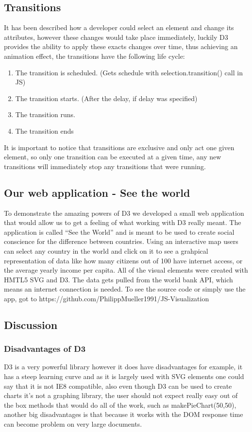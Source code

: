 \documentclass{bioinfo}
\begin{document}
\subsection{Transitions} \label{s:transitions}
It has been described how a developer could select an element and change its attributes, however these changes would take place immediately, luckily D3 provides the ability to apply these exacts changes over time, thus achieving an animation effect, the transitions have the following life cycle:
\begin{enumerate}
\item The transition is scheduled. (Gets schedule with selection.transition() call in JS)
\item The transition starts. (After the delay, if delay was specified)
\item The transition runs.
\item The transition ends
\end{enumerate}
It is important to notice that transitions are exclusive and only act one given element, so only one transition can be executed at a given time, any new transitions will immediately stop any transitions that were running.

\subsection{Our web application - See the world}
To demonstrate the amazing powers of D3 we developed a small web application that would allow us to get a feeling of what working with D3 really meant. The application is called “See the World” and is meant to be used to create social conscience for the difference between countries. Using an interactive map users can select any country in the world and click on it to see a grahpical representation of data like how many citizens out of 100 have internet access, or the average yearly income per capita.
\newline
All of the visual elements were created with HMTL5 SVG and D3. The data gets pulled from the world bank API, which means an internet connection is needed. To see the source code or simply use the app, got to https://github.com/PhilippMueller1991/JS-Visualization

\subsection{Discussion}
\subsubsection{Disadvantages of D3}
\hfill \break
D3 is a very powerful library however it does have disadvantages for example, it has a steep learning curve and as it is largely used with SVG elements one could say that it is not IE8 compatible, also even though D3 can be used to create charts it’s not a graphing library, the user should not expect really easy out of the box methods that would do all of the work, such as makePieChart(50,50), another big disadvantages is that because it works with the DOM response time can become problem on very large documents.
\end{document}
